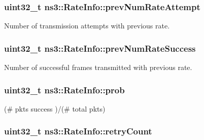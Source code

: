 \subsubsection[{\texorpdfstring{prev\+Num\+Rate\+Attempt}{prevNumRateAttempt}}]{\setlength{\rightskip}{0pt plus 5cm}uint32\+\_\+t ns3\+::\+Rate\+Info\+::prev\+Num\+Rate\+Attempt}\hypertarget{structns3_1_1RateInfo_ad8211951a43c7f171155f54ec34d05e0}{}\label{structns3_1_1RateInfo_ad8211951a43c7f171155f54ec34d05e0}


Number of transmission attempts with previous rate. 

\subsubsection[{\texorpdfstring{prev\+Num\+Rate\+Success}{prevNumRateSuccess}}]{\setlength{\rightskip}{0pt plus 5cm}uint32\+\_\+t ns3\+::\+Rate\+Info\+::prev\+Num\+Rate\+Success}\hypertarget{structns3_1_1RateInfo_a76afd4eb7f46ff410b42f2b67d3afefc}{}\label{structns3_1_1RateInfo_a76afd4eb7f46ff410b42f2b67d3afefc}


Number of successful frames transmitted with previous rate. 

\subsubsection[{\texorpdfstring{prob}{prob}}]{\setlength{\rightskip}{0pt plus 5cm}uint32\+\_\+t ns3\+::\+Rate\+Info\+::prob}\hypertarget{structns3_1_1RateInfo_aafde58f06eb12e8761b096cec8833c35}{}\label{structns3_1_1RateInfo_aafde58f06eb12e8761b096cec8833c35}


(\# pkts success )/(\# total pkts) 

\subsubsection[{\texorpdfstring{retry\+Count}{retryCount}}]{\setlength{\rightskip}{0pt plus 5cm}uint32\+\_\+t ns3\+::\+Rate\+Info\+::retry\+Count}\hypertarget{structns3_1_1RateInfo_ab222813b4eee4612825c77be82a75bfe}{}\label{structns3_1_1RateInfo_ab222813b4eee4612825c77be82a75bfe}


